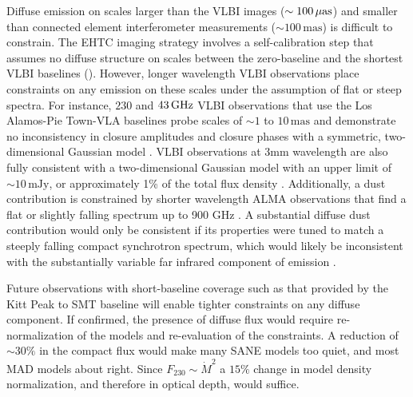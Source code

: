 Diffuse emission on scales larger than the VLBI images ($\sim 100\,\mathrm{\mu as}$) and smaller than connected element interferometer measurements ($\sim 100\,\mathrm{mas}$) is difficult to constrain.  The EHTC imaging strategy involves a self-calibration step that assumes no diffuse structure on scales between the zero-baseline and the shortest VLBI baselines ().  However, longer wavelength VLBI observations place constraints on any emission on these scales under the assumption of flat or steep spectra.  For instance, $230$ and $43\,\mathrm{GHz}$ VLBI observations that use the Los Alamos-Pie Town-VLA baselines probe scales of $\sim 1$ to $10\,\mathrm{mas}$ and demonstrate no inconsistency in closure amplitudes and closure phases with a symmetric, two-dimensional Gaussian model \citep{2004Sci...304..704B}.  VLBI observations at 3mm wavelength are also fully consistent with a two-dimensional Gaussian model with an upper limit of $\sim 10\,\mathrm{mJy}$, or approximately 1\% of the total flux density \citep{2019A&A...621A.119B}.  Additionally, a dust contribution is constrained by shorter wavelength ALMA observations that find a flat or slightly falling spectrum up to 900 GHz \citep{2019ApJ...881L...2B}.  A substantial diffuse dust contribution would only be consistent if its properties were tuned to match a steeply falling compact synchrotron spectrum, which would likely be inconsistent with the substantially variable far infrared component of \sgra emission \citep{2016ApJ...825...32S, 2018ApJ...862..129V}.

Future observations with short-baseline coverage such as that provided by the Kitt Peak to SMT baseline will enable tighter constraints on any diffuse component.  If confirmed, the presence of diffuse flux would require re-normalization of the models and re-evaluation of the constraints.  A reduction of $\sim 30\%$ in the compact flux would make many SANE models too quiet, and most MAD models about right.  Since $F_{230} \sim \dot{M}^2$ a $15\%$ change in model density normalization, and therefore in optical depth, would suffice.  


